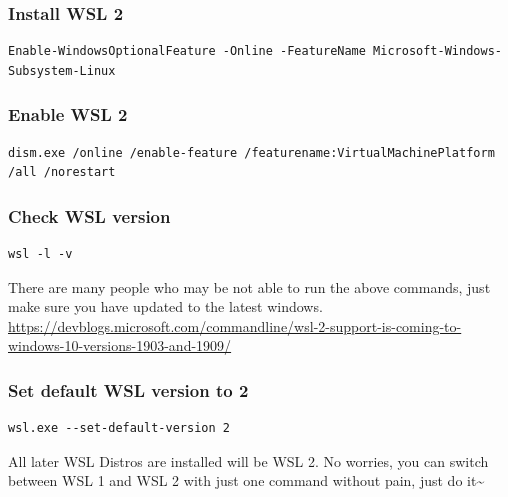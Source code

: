 \documentclass[10pt]{article}
\begin{document}
\subsubsection{Install WSL 2}
\label{sec:org486b32f}
\begin{verbatim}
Enable-WindowsOptionalFeature -Online -FeatureName Microsoft-Windows-Subsystem-Linux
\end{verbatim}

\subsubsection{Enable WSL 2}
\label{sec:org393eafd}
\begin{verbatim}
dism.exe /online /enable-feature /featurename:VirtualMachinePlatform /all /norestart
\end{verbatim}

\subsubsection{Check WSL version}
\label{sec:org8c494f1}
\begin{verbatim}
wsl -l -v
\end{verbatim}
There are many people who may be not able to run the above commands, just make sure you have updated to the latest windows.
\url{https://devblogs.microsoft.com/commandline/wsl-2-support-is-coming-to-windows-10-versions-1903-and-1909/}

\subsubsection{Set default WSL version to 2}
\label{sec:org54fe6e3}
\begin{verbatim}
wsl.exe --set-default-version 2
\end{verbatim}
All later WSL Distros are installed will be WSL 2. No worries, you can switch between WSL 1 and WSL 2 with just one command without pain, just do it\textasciitilde{}
\end{document}
